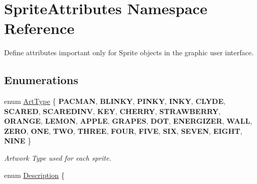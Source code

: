 \hypertarget{namespace_sprite_attributes}{}\section{Sprite\+Attributes Namespace Reference}
\label{namespace_sprite_attributes}


Define attributes important only for Sprite objects in the graphic user interface.  


\subsection*{Enumerations}
\begin{DoxyCompactItemize}
\item 
\mbox{\label{namespace_sprite_attributes_afb5447c311bc29f0ce8ddfd025c6e998}} 
enum \mbox{\hyperlink{namespace_sprite_attributes_afb5447c311bc29f0ce8ddfd025c6e998}{Art\+Type}} \{ \newline
{\bfseries P\+A\+C\+M\+AN}, 
{\bfseries B\+L\+I\+N\+KY}, 
{\bfseries P\+I\+N\+KY}, 
{\bfseries I\+N\+KY}, 
\newline
{\bfseries C\+L\+Y\+DE}, 
{\bfseries S\+C\+A\+R\+ED}, 
{\bfseries S\+C\+A\+R\+E\+D\+I\+NV}, 
{\bfseries K\+EY}, 
\newline
{\bfseries C\+H\+E\+R\+RY}, 
{\bfseries S\+T\+R\+A\+W\+B\+E\+R\+RY}, 
{\bfseries O\+R\+A\+N\+GE}, 
{\bfseries L\+E\+M\+ON}, 
\newline
{\bfseries A\+P\+P\+LE}, 
{\bfseries G\+R\+A\+P\+ES}, 
{\bfseries D\+OT}, 
{\bfseries E\+N\+E\+R\+G\+I\+Z\+ER}, 
\newline
{\bfseries W\+A\+LL}, 
{\bfseries Z\+E\+RO}, 
{\bfseries O\+NE}, 
{\bfseries T\+WO}, 
\newline
{\bfseries T\+H\+R\+EE}, 
{\bfseries F\+O\+UR}, 
{\bfseries F\+I\+VE}, 
{\bfseries S\+IX}, 
\newline
{\bfseries S\+E\+V\+EN}, 
{\bfseries E\+I\+G\+HT}, 
{\bfseries N\+I\+NE}
 \}
\begin{DoxyCompactList}\small\item\em Artwork Type used for each sprite. \end{DoxyCompactList}\item 
\mbox{\label{namespace_sprite_attributes_a3ece96d6288b14d53d84e2138392395c}} 
enum \mbox{\hyperlink{namespace_sprite_attributes_a3ece96d6288b14d53d84e2138392395c}{Description}} \{ \newline

\end{DoxyCompactItemize}
